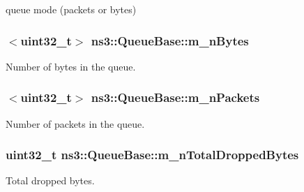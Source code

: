 queue mode (packets or bytes) 

\subsubsection[{\texorpdfstring{m\+\_\+n\+Bytes}{m_nBytes}}]{$<$uint32\+\_\+t$>$ ns3\+::\+Queue\+Base\+::m\+\_\+n\+Bytes\hspace{0.3cm}{\ttfamily [private]}}\hypertarget{classns3_1_1QueueBase_ac6294a28b80d4039bb4a0c8a336ed1fe}{}\label{classns3_1_1QueueBase_ac6294a28b80d4039bb4a0c8a336ed1fe}


Number of bytes in the queue. 

\subsubsection[{\texorpdfstring{m\+\_\+n\+Packets}{m_nPackets}}]{$<$uint32\+\_\+t$>$ ns3\+::\+Queue\+Base\+::m\+\_\+n\+Packets\hspace{0.3cm}{\ttfamily [private]}}\hypertarget{classns3_1_1QueueBase_a1b9e3767ab060e792378c35ef7a67427}{}\label{classns3_1_1QueueBase_a1b9e3767ab060e792378c35ef7a67427}


Number of packets in the queue. 

\subsubsection[{\texorpdfstring{m\+\_\+n\+Total\+Dropped\+Bytes}{m_nTotalDroppedBytes}}]{\setlength{\rightskip}{0pt plus 5cm}uint32\+\_\+t ns3\+::\+Queue\+Base\+::m\+\_\+n\+Total\+Dropped\+Bytes\hspace{0.3cm}{\ttfamily [private]}}\hypertarget{classns3_1_1QueueBase_a87781232ba70a4ddcf09988b5b259fd6}{}\label{classns3_1_1QueueBase_a87781232ba70a4ddcf09988b5b259fd6}


Total dropped bytes. 

